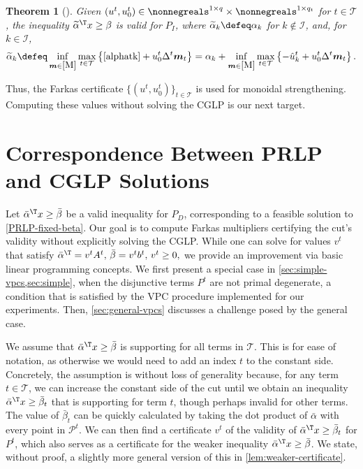 \documentclass[oribibl,envcountsame]{llncs}
\newtheorem{theorem}{Theorem}
\theoremstyle{remark}
\theoremstyle{definition}
\renewcommand{\vec}[1]{\boldsymbol{#1}}
\newcommand{\pointset}{\mathcal{P}}
\newcommand{\intvars}{\mathcal{I}}
\newcommand{\PI}{P_{I}}
\newcommand{\PD}{P_{D}}
\newcommand{\disjTermsIndexSet}{\mathcal{T}}
\newcommand{\M}{\ref{M}}
\newcommand{\alphatk}{\ref{alphatk}}
\newcommand{\Deltat}{\Delta^t}
\newcommand{\monoid}{\vec{m}}
\newcommand{\numRowsP}{q}
\newcommand{\numRowsDt}{q_t}
\begin{document}
\begin{theorem}[{\cite[Theorem~3]{BalJer80}}]
\label{thm:monoidal-strengthening-structural-space}
  Given 
    $({u}^t,u^t_0) \in \nonnegreals^{1 \times \numRowsP} \times \nonnegreals^{1 \times \numRowsDt}$ for $t \in \disjTermsIndexSet$,
  the inequality $\widetilde{\alpha}^\T x \ge \beta$ is valid for $\PI$,
  where
  $\widetilde{\alpha}_k \defeq \alpha_k$ for $k \notin \intvars$,
  and,
  for $k \in \intvars$,
    \begin{equation*}
      \widetilde{\alpha}_k 
        \defeq \inf_{\monoid \in \M} \max_{t \in \disjTermsIndexSet} \left\{ \alphatk + u^t_0 \Deltat \monoid_t \right\}
        = \alpha_k + \inf_{\monoid \in \M} \max_{t \in \disjTermsIndexSet} \left\{ -\hat{u}^t_k + u^t_0 \Deltat \monoid_t \right\}.
    \end{equation*}
\end{theorem}

Thus, the Farkas certificate 
    $\{(u^t, u^t_0)\}_{t \in \disjTermsIndexSet}$ 
is used for monoidal strengthening.
Computing these values without solving the CGLP is our next target.

\section{Correspondence Between PRLP and CGLP Solutions}
\label{sec:correspondence}

Let $\bar{\alpha}^\T x \ge \bar{\beta}$ be a valid inequality for $\PD$, corresponding to a feasible solution to \cref{PRLP-fixed-beta}.
Our goal is to compute Farkas multipliers certifying the cut's validity without explicitly solving the CGLP.
While one can solve for values $v^t$ that satisfy
    $
            \bar{\alpha}^\T = v^t A^t,\,
            \bar{\beta} = v^t b^t,\,
            v^t \ge 0
        ,
    $
we provide an improvement via basic linear programming concepts.
We first present a special case in \cref{sec:simple-vpcs,sec:simple}, when the disjunctive terms $P^t$ are not primal degenerate,
a condition that is satisfied by the VPC procedure implemented for our experiments.
Then, \cref{sec:general-vpcs} discusses a challenge posed by the general case.

We assume that $\bar{\alpha}^\T x \ge \bar{\beta}$ is supporting for all terms in $\disjTermsIndexSet$.
This is for ease of notation, as otherwise we would need to add an index $t$ to the constant side.
Concretely, the assumption is without loss of generality because, for any term $t \in \disjTermsIndexSet$, we can increase the constant side of the cut until we obtain an inequality $\bar{\alpha}^\T x \ge \bar{\beta}_t$ that is supporting for term $t$, though perhaps invalid for other terms.
The value of $\bar{\beta}_t$ can be quickly calculated by taking the dot product of $\bar{\alpha}$ with every point in $\pointset^t$.
We can then find a certificate $v^t$ of the validity of $\bar{\alpha}^\T x \ge \bar{\beta}_t$ for $P^t$,
which also serves as a certificate for the weaker inequality $\bar{\alpha}^\T x \ge \bar{\beta}$.
We state, without proof, a slightly more general version of this in \cref{lem:weaker-certificate}.
\end{document}
